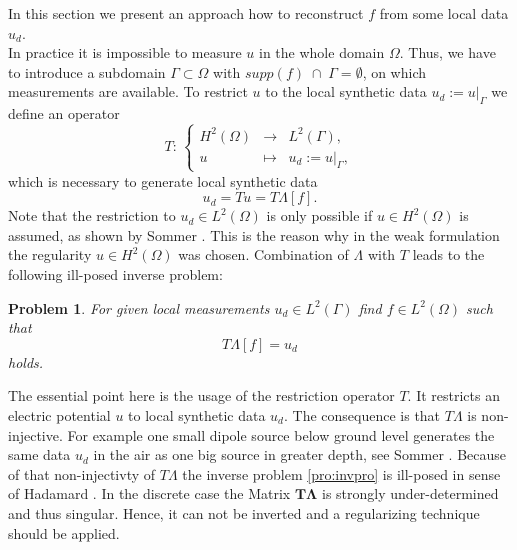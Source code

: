 \documentclass[a4paper, 11pt, twoside]{article}
\newtheorem*{problem}{Problem}
\begin{document}
In this section we present an approach how to reconstruct $f$ from some local data $u_d$.\\

In practice it is impossible to measure $u$ in the whole domain $\Omega$. Thus, we have to introduce a subdomain $\Gamma\subset\Omega$ with $supp(f)\;\cap\;\Gamma=\emptyset$, on which measurements are available. To restrict $u$ to the local synthetic data $u_d:=u|_\Gamma$ we define an operator
%
\begin{equation}\label{eq:restrictionoperator}
	T:\,\left\{\begin{array}{ccc}
	H^2(\Omega) &\to &L^2(\Gamma),\\
	u &\mapsto &u_d:=u|_{\Gamma},
\end{array}\right.
\end{equation}
%
which is necessary to generate local synthetic data
%
\begin{equation*}
	u_d = Tu = T\Lambda[f].
\end{equation*}
%
Note that the restriction to $u_d\in L^2(\Omega)$ is only possible if $u\in H^2(\Omega)$ is assumed, as shown by Sommer \cite{bib:som12}. This is the reason why in the weak formulation the regularity $u\in H^2(\Omega)$ was chosen. Combination of $\Lambda$ with $T$ leads to the following ill-posed inverse problem:
\begin{problem}
For given local measurements $u_d\in L^2(\Gamma)$ find $f\in L^2(\Omega)$ such that
\begin{equation}\label{pro:invpro}
	T\Lambda[f]=u_d
\end{equation}
holds.
\end{problem}
The essential point here is the usage of the restriction operator $T$. It restricts an electric potential $u$ to local synthetic data $u_d$. The consequence is that $T\Lambda$ is non-injective. For example one small dipole source below ground level generates the same data $u_d$ in the air as one big source in greater depth, see Sommer \cite[Chap..1]{bib:som12}. Because of that non-injectivty of $T\Lambda$ the inverse problem \eqref{pro:invpro} is ill-posed in sense of Hadamard \cite{bib:had15}. In the discrete case the Matrix $\boldsymbol{T\Lambda}$ is strongly under-determined and thus singular. Hence, it can not be inverted and a regularizing technique should be applied.
%
%
\end{document}

